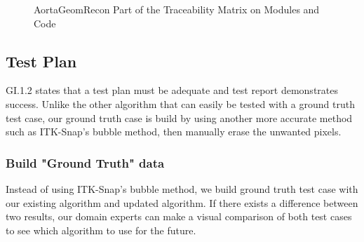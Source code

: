 \begin{figure}[H]
    \centering
    \caption[AortaGeomRecon Part of the Traceability Matrix on Modules and Code]{AortaGeomRecon Part of the Traceability Matrix on Modules and Code}
    \label{fig_agr_mtm_modules_code}
\end{figure}

\subsection{Test Plan}

GI.1.2 states that a test plan must be adequate and test report demonstrates success. Unlike the other algorithm that can easily be tested with a ground truth test case, our ground truth case is build by using another more accurate method such as ITK-Snap's bubble method, then manually erase the unwanted pixels.

\subsubsection{Build "Ground Truth" data}
Instead of using ITK-Snap's bubble method, we build ground truth test case with our existing algorithm and updated algorithm. If there exists a difference between two results, our domain experts can make a visual comparison of both test cases to see which algorithm to use for the future.

